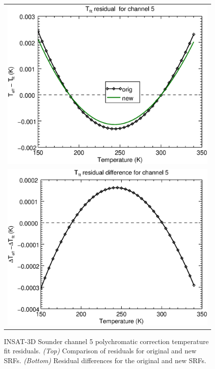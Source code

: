 \begin{figure}[H]
  \centering
  \begin{tabular}{c}
    \includegraphics[scale=0.55]{graphics/sndr/tfit/sndr_insat3d-5.tfit.eps} \\
    \includegraphics[scale=0.55]{graphics/sndr/tfit/sndr_insat3d-5.tfit.difference.eps}
  \end{tabular}
  \caption{INSAT-3D Sounder channel 5 polychromatic correction temperature fit residuals. \emph{(Top)} Comparison of residuals for original and new SRFs. \emph{(Bottom)} Residual differences for the original and new SRFs.}
  \label{fig:sndr_ch5_tfit}
\end{figure}


